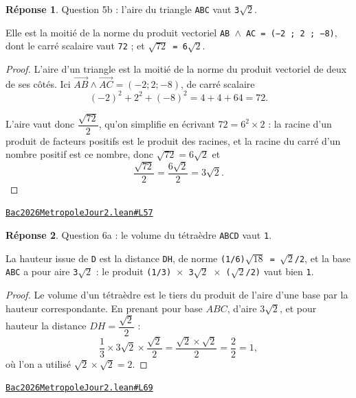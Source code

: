 \documentclass[11pt,a4paper]{article}
\theoremstyle{definition}
\theoremstyle{plain}
\theoremstyle{definition}
\newtheorem*{reponse}{Réponse}
\newcommand{\source}[2]{\par\smallskip\noindent\hfill{\footnotesize\href{#1}{\texttt{#2}}}\par\smallskip}
\begin{document}
\begin{reponse}
Question 5b : l'aire du triangle \texttt{ABC} vaut \texttt{3\(\sqrt{2}\)}.

Elle est la moitié de la norme du produit vectoriel \texttt{AB \(\land\) AC = (−2 ; 2 ; −8)}, dont le
carré scalaire vaut \texttt{72} ; et \texttt{\(\sqrt{72}\) = 6\(\sqrt{2}\)}.
\end{reponse}
\begin{proof}
L'aire d'un triangle est la moitié de la norme du produit vectoriel de deux de ses côtés.
Ici $\vec{AB} \wedge \vec{AC} = (-2 ; 2 ; -8)$, de carré scalaire
\[ (-2)^2 + 2^2 + (-8)^2 = 4 + 4 + 64 = 72 . \]

L'aire vaut donc $\dfrac{\sqrt{72}}{2}$, qu'on simplifie en écrivant $72 = 6^2 \times 2$ :
la racine d'un produit de facteurs positifs est le produit des racines, et la racine du
carré d'un nombre positif est ce nombre, donc $\sqrt{72} = 6\sqrt{2}$ et
\[ \frac{\sqrt{72}}{2} = \frac{6\sqrt{2}}{2} = 3\sqrt{2} . \]
\end{proof}
\source{https://github.com/Commutator-IO/learn-lean/blob/main/exams/2026/Bac2026MetropoleJour2.lean\#L57}{Bac2026MetropoleJour2.lean\#L57}

\begin{reponse}
Question 6a : le volume du tétraèdre \texttt{ABCD} vaut \texttt{1}.

La hauteur issue de \texttt{D} est la distance \texttt{DH}, de norme \texttt{(1/6)\(\sqrt{18}\) = \(\sqrt{2}\)/2}, et la base
\texttt{ABC} a pour aire \texttt{3\(\sqrt{2}\)} : le produit \texttt{(1/3) \(\times\) 3\(\sqrt{2}\) \(\times\) (\(\sqrt{2}\)/2)} vaut bien \texttt{1}.
\end{reponse}
\begin{proof}
Le volume d'un tétraèdre est le tiers du produit de l'aire d'une base par la hauteur
correspondante. En prenant pour base $ABC$, d'aire $3\sqrt{2}$, et pour hauteur la distance
$DH = \dfrac{\sqrt{2}}{2}$ :
\[ \frac{1}{3} \times 3\sqrt{2} \times \frac{\sqrt{2}}{2}
   = \frac{\sqrt{2} \times \sqrt{2}}{2} = \frac{2}{2} = 1 , \]
où l'on a utilisé $\sqrt{2} \times \sqrt{2} = 2$.
\end{proof}
\source{https://github.com/Commutator-IO/learn-lean/blob/main/exams/2026/Bac2026MetropoleJour2.lean\#L69}{Bac2026MetropoleJour2.lean\#L69}
\end{document}
